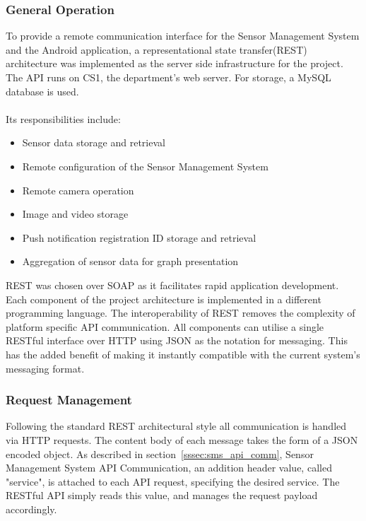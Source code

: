 \documentclass{article}
\begin{document}
\subsubsection{General Operation}
To provide a remote communication interface for the Sensor Management System and the Android application, a representational state transfer(REST) architecture was implemented as the server side infrastructure for the project. The API runs on CS1, the department’s web server. For storage, a MySQL database is used.  \\\\
Its responsibilities include:
\begin{itemize}
  \item Sensor data storage and retrieval
  \item Remote configuration of the Sensor Management System
  \item Remote camera operation
  \item Image and video storage
  \item Push notification registration ID storage and retrieval
  \item Aggregation of sensor data for graph presentation
\end{itemize}
REST was chosen over SOAP as it facilitates rapid application development. Each component of the project architecture is implemented in a different programming language. The interoperability of REST removes the complexity of platform specific API communication. All components can utilise a single RESTful interface over HTTP using  JSON as the notation for messaging. This has the added benefit of making it instantly compatible with the current system’s messaging format.

\subsubsection{Request Management}
Following the standard REST architectural style all communication is handled via HTTP requests. The content body of each message takes the form of a JSON encoded object. As described in section~\ref{sssec:sms_api_comm}, Sensor Management System API Communication, an addition header value, called "service", is attached to each API request, specifying the desired service. The RESTful API simply reads this value, and manages the request payload accordingly.
\end{document}
